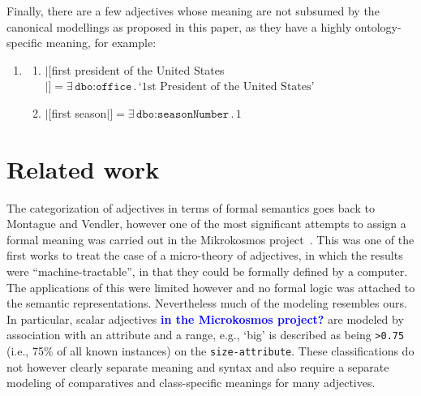 \documentclass[11pt]{article}
\begin{document}
Finally, there are a few adjectives whose meaning are not subsumed by the canonical modellings as proposed in this paper, 
as they have a highly ontology-specific meaning, for example:
\begin{enumerate}[resume]
\item \begin{enumerate}
\item $|[$first president of the United States$|]=\exists\,\texttt{dbo:office}\,.\,\text{`1st President of the United States'}$
\item $|[$first season$|]=\exists\,\texttt{dbo:seasonNumber}\,.\,1$
\end{enumerate}
\end{enumerate}






\section{Related work}

The categorization of adjectives in terms of formal semantics goes back to Montague and Vendler, however one of the most significant attempts to assign a formal meaning was carried out in the Mikrokosmos project~\cite{raskin1995lexical}. This was one of the first works to treat the case of a micro-theory of adjectives, in which the results were ``machine-tractable'', in that they could be formally defined by a computer. The applications of this were limited however and no formal logic was attached to the semantic representations. Nevertheless much of the modeling resembles ours. In particular, scalar adjectives \textbf{\textcolor{blue}{in the Microkosmos project?}} are modeled by association with an attribute and a range, e.g., `big' is described as being {\tt >0.75} (i.e., 75\% of all known instances) on the {\tt size-attribute}. These classifications do not however clearly separate meaning and syntax and also require a separate modeling of comparatives and class-specific meanings for many adjectives.
\end{document}
